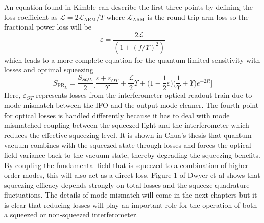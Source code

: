 	An equation found in Kimble \cite{KimbleConversion} can describe the first three points by defining the loss coefficient as $\mathcal{L} = 2 \mathcal{L}_\text{ARM} / T$ where  $\mathcal{L}_\text{ARM}$ is the round trip arm loss so the fractional power loss will be
	\begin{equation}
	\varepsilon = \frac{2 \mathcal{L}}{(1 + (f/\Upsilon)^2)}
	\end{equation}
	which leads to a more complete equation for the quantum limited sensitivity with losses and optimal squeezing
	\begin{equation}
	S_{\text{PR}_L} = \frac{S_{SQL}}{2} \bigg[ \frac{\varepsilon + \varepsilon_{OT}}{\Upsilon}  + \frac{\mathcal{L}}{2}\Upsilon + \bigg(1 - \frac{1}{2} \varepsilon \bigg) \bigg( \frac{1}{\Upsilon}  + \Upsilon \bigg) e^{-2R} \bigg]
	\end{equation}
	Here, $ \varepsilon_{OT}$ represents losses from the interferometer optical readout train due to mode mismatch between the IFO and the output mode cleaner.  The fourth point for optical losses is handled differently because it has to deal with mode mismatched coupling between the squeezed light and the interferometer which reduces the effective squeezing level.  It is shown in Chua's thesis \cite{Chua_thesis} that quantum vacuum combines with the squeezed state through losses and forces the optical field variance back to the vacuum state, thereby degrading the squeezing benefits.  By coupling the fundamental field that is squeezed to a combination of higher order modes, this will also act as a direct loss.  Figure 1 of Dwyer et al \cite{Dwyer} shows that squeezing efficacy depends strongly on total losses and the squeeze quadrature fluctuations. The details of mode mismatch will come in the next chapters but it is clear that reducing losses will play an important role for the operation of both a squeezed or non-squeezed interferometer.
	
